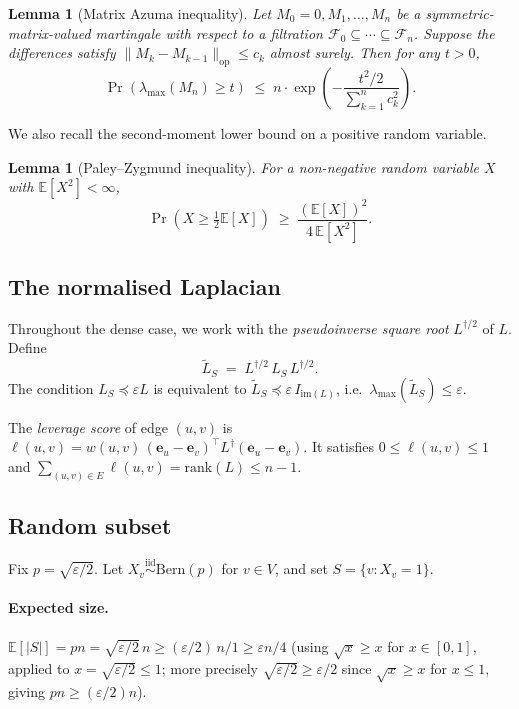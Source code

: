 \documentclass[12pt]{article}
\newtheorem{lemma}[theorem]{Lemma}
\theoremstyle{definition}
\theoremstyle{remark}
\begin{document}
\begin{lemma}[Matrix Azuma inequality]\label{lem:azuma}
Let $M_0 = 0, M_1, \ldots, M_n$ be a symmetric-matrix-valued martingale with
respect to a filtration $\mathcal{F}_0 \subseteq \cdots \subseteq \mathcal{F}_n$.
Suppose the differences satisfy $\|M_k - M_{k-1}\|_{\mathrm{op}} \le c_k$
almost surely.  Then for any $t > 0$,
\[
  \Pr\!\left(\lambda_{\max}(M_n) \ge t\right)
  \;\le\; n \cdot \exp\!\!\left(-\frac{t^2/2}{\sum_{k=1}^n c_k^2}\right).
\]
\end{lemma}

We also recall the second-moment lower bound on a positive random variable.

\begin{lemma}[Paley--Zygmund inequality]\label{lem:pz}
For a non-negative random variable $X$ with $\mathbb{E}[X^2] < \infty$,
\[
  \Pr\!\left(X \ge \tfrac12 \mathbb{E}[X]\right)
  \;\ge\; \frac{(\mathbb{E}[X])^2}{4\,\mathbb{E}[X^2]}.
\]
\end{lemma}

\subsection{The normalised Laplacian}

Throughout the dense case, we work with the \emph{pseudoinverse square root}
$L^{\dagger/2}$ of $L$.  Define
\[
  \widetilde{L}_S \;=\; L^{\dagger/2}\,L_S\,L^{\dagger/2}.
\]
The condition $L_S \preceq \varepsilon L$ is equivalent to
$\widetilde{L}_S \preceq \varepsilon\, I_{\mathrm{im}(L)}$, i.e.\
$\lambda_{\max}(\widetilde{L}_S) \le \varepsilon$.

The \emph{leverage score} of edge $(u,v)$ is
$\ell(u,v) = w(u,v)\,(\mathbf{e}_u-\mathbf{e}_v)^\top L^\dagger (\mathbf{e}_u-\mathbf{e}_v)$.
It satisfies $0 \le \ell(u,v) \le 1$ and
$\sum_{(u,v)\in E}\ell(u,v) = \mathrm{rank}(L) \le n-1$.

\subsection{Random subset}

Fix $p = \sqrt{\varepsilon/2}$.  Let $X_v \overset{\mathrm{iid}}{\sim}
\mathrm{Bern}(p)$ for $v \in V$, and set $S = \{v : X_v = 1\}$.

\paragraph{Expected size.}
$\mathbb{E}[|S|] = pn = \sqrt{\varepsilon/2}\,n \ge (\varepsilon/2)\,n/1 \ge \varepsilon n/4$
(using $\sqrt{x} \ge x$ for $x \in [0,1]$, applied to $x = \sqrt{\varepsilon/2}
\le 1$; more precisely $\sqrt{\varepsilon/2} \ge \varepsilon/2$ since
$\sqrt{x} \ge x$ for $x\le 1$, giving $pn \ge (\varepsilon/2)n$).
\end{document}
